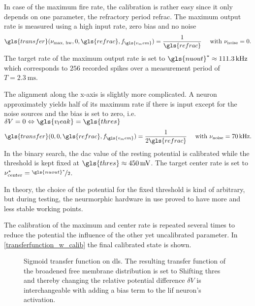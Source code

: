 In case of the maximum fire rate, the calibration is rather easy since it only depends on one parameter, the refractory period \gls{refrac}. The maximum output rate is measured using a high input rate, zero bias and no noise
\begin{equation}
\gls{transfer}(\nu_\text{max, hw}, 0, \gls{refrac}, f_{\gls{v_mem}}) = \frac{1}{\gls{refrac}} \quad \text{ with } \nu_\text{noise} = 0.
\end{equation}
The target rate of the maximum output rate is set to $\gls{nuout}^* \approx \SI{111.3}{\kilo \Hz}$ which corresponds to $256$ recorded spikes over a measurement period of $T=\SI{2.3}{\milli \s}$.

The alignment along the x-axis is slightly more complicated. A neuron approximately yields half of its maximum rate if there is input except for the noise sources and the bias is set to zero, i.e. $\delta V = 0 \Leftrightarrow \gls{v_leak} = \gls{thres}$
\begin{equation}
	\gls{transfer}(0, 0, \gls{refrac}, f_{\gls{v_mem}}) = \frac{1}{2\gls{refrac}} \quad \text{ with } \nu_\text{noise} = \SI{70}{kHz}.
\end{equation}
In the binary search, the \gls{dac} value of the resting potential is calibrated while the threshold is kept fixed at $\gls{thres} \approx \SI{450}{\milli \V}$. The target center rate is set to $\nu_\text{center}^* = \nicefrac{\gls{nuout}^*}{2}$.

In theory, the choice of the potential for the fixed threshold is kind of arbitrary, but during testing, the neurmorphic hardware in use proved to have more and less stable working points. 

The calibration of the maximum and center rate is repeated several times to reduce the potential the influence of the other yet uncalibrated parameter. In \cref{transferfunction_w_calib} the final calibrated state is shown. 


\begin{figure}
	\begin{center}
		
	\end{center}
	\caption[Sigmoid transfer function on \gls{dls}.]{Sigmoid transfer function on \gls{dls}. The resulting transfer function of the broadened free membrane distribution is set to  Shifting \gls{thres} and thereby changing the relative potential difference $\delta V$ is interchangeable with adding a bias term to the \gls{lif} neuron's activation.}
	\label{transferfunction_with_bias}
\end{figure}


